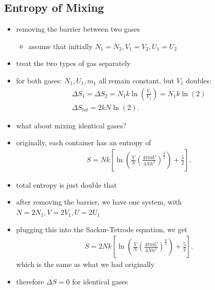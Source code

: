 \documentclass[10pt]{article}
\begin{document}
\subsection{Entropy of Mixing}
\begin{itemize}
    \item removing the barrier between two gases
        \begin{itemize}
            \item assume that initially $ N_1 = N_2, V_1=V_2, U_1=U_2$
        \end{itemize}
    \item treat the two types of gas separately
    \item for both gases: $ N_1, U_1, m_1$ all remain constant, but $ V_1$ doubles:
        \begin{gather*}
            \Delta S_1 = \Delta S_2 = N_1 k \ln \left( \frac{V_i}{V_f} \right) =N_1k \ln (2) \\ 
            \Delta S_{tot} = 2kN\ln (2)
        .\end{gather*}
    \item what about mixing identical gases?
    \item originally, each container has an entropy of 
        \begin{align*}
            S = Nk \left[ \ln \left( \frac{V}{N} \left( \frac{4\pi mU}{3Nh^2} \right)^{\frac{3}{2}}  \right) + \frac{5}{2} \right] 
        .\end{align*}
    \item total entropy is just double that
    \item after removing the barrier, we have one system, with $N=2N_1, V = 2V_1, U = 2U_1$
    \item plugging this into the Sackur-Tetrode equation, we get
        \begin{align*}
            S = 2Nk \left[ \ln \left( \frac{V}{N} \left( \frac{4\pi mU}{3Nh^2} \right)^{\frac{3}{2}}  \right) + \frac{5}{2} \right] 
        .\end{align*}
        which is the same as what we had originally
    \item therefore $\Delta S = 0$ for identical gases
\end{itemize}
\end{document}
